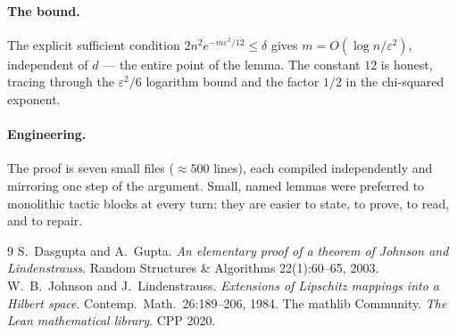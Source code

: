 \documentclass[11pt]{article}
\theoremstyle{remark}
\newcommand{\eps}{\varepsilon}
\begin{document}
\paragraph{The bound.} The explicit sufficient condition $2n^2e^{-m\eps^2/12}\le\delta$
gives $m=O(\log n/\eps^2)$, independent of $d$ --- the entire point of the lemma. The
constant $12$ is honest, tracing through the $\eps^2/6$ logarithm bound and the factor
$1/2$ in the chi-squared exponent.

\paragraph{Engineering.} The proof is seven small files ($\approx500$ lines), each
compiled independently and mirroring one step of the argument. Small, named lemmas were
preferred to monolithic tactic blocks at every turn: they are easier to state, to prove,
to read, and to repair.

\begin{thebibliography}{9}
 S.~Dasgupta and A.~Gupta. \emph{An elementary proof of a theorem of
Johnson and Lindenstrauss}. Random Structures \& Algorithms 22(1):60--65, 2003.
 W.~B.~Johnson and J.~Lindenstrauss. \emph{Extensions of Lipschitz mappings
into a Hilbert space}. Contemp.\ Math.\ 26:189--206, 1984.
 The mathlib Community. \emph{The Lean mathematical library}. CPP 2020.
\end{thebibliography}
\end{document}
